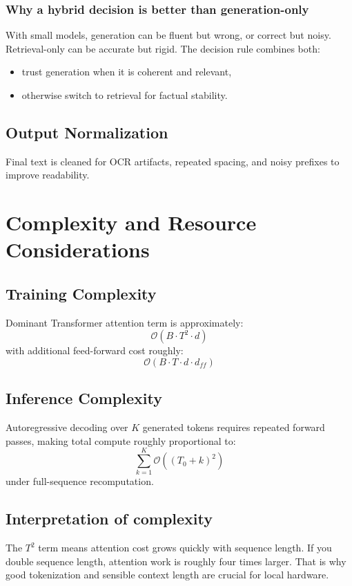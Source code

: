 \documentclass[a4paper,11pt]{article}
\begin{document}
\subsubsection{Why a hybrid decision is better than generation-only}
With small models, generation can be fluent but wrong, or correct but noisy.
Retrieval-only can be accurate but rigid.
The decision rule combines both:
\begin{itemize}[leftmargin=1.5em]
    \item trust generation when it is coherent and relevant,
    \item otherwise switch to retrieval for factual stability.
\end{itemize}

\subsection{Output Normalization}
Final text is cleaned for OCR artifacts, repeated spacing, and noisy prefixes to improve readability.

\section{Complexity and Resource Considerations}
\subsection{Training Complexity}
Dominant Transformer attention term is approximately:
\[
\mathcal{O}(B\cdot T^2 \cdot d)
\]
with additional feed-forward cost roughly:
\[
\mathcal{O}(B\cdot T\cdot d\cdot d_{ff})
\]

\subsection{Inference Complexity}
Autoregressive decoding over $K$ generated tokens requires repeated forward passes, making total compute roughly proportional to:
\[
\sum_{k=1}^{K} \mathcal{O}((T_0+k)^2)
\]
under full-sequence recomputation.

\subsection{Interpretation of complexity}
The $T^2$ term means attention cost grows quickly with sequence length.
If you double sequence length, attention work is roughly four times larger.
That is why good tokenization and sensible context length are crucial for local hardware.
\end{document}
